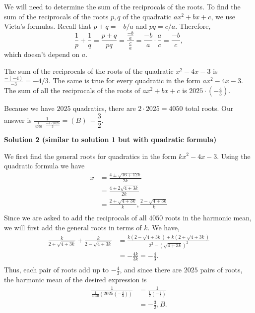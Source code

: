 \begin{enumerate}
We will need to determine the sum of the reciprocals of the roots. To find the sum of the reciprocals of the roots $p,q$ of the quadratic $ax^2+bx+c$, we use Vieta's formulas. Recall that $p+q = -b/a$ and $pq = c/a$. Therefore, 
 \[\frac{1}{p} + \frac{1}{q} = \frac{p+q}{pq} = \frac{\frac{-b}{a}}{\frac{c}{a}} = \frac{-b}{a} \cdot \frac{a}{c} = \frac{-b}{c},\]which doesn't depend on $a$.

 The sum of the reciprocals of the roots of the quadratic $x^2-4x-3$ is $\frac{-(-4)}{-3} = -4/3.$ The same is true for every quadratic in the form $ax^2-4x-3$. The sum of all the reciprocals of the roots of $ax^2+bx+c$ is $2025 \cdot \left(-\frac{4}{3}\right).$

 Because we have $2025$ quadratics, there are $2 \cdot 2025 = 4050$ total roots. Our answer is $\frac{1}{\frac{1}{4050}\cdot \frac{-4\cdot 2025}{3}} =\boxed{(B)\ -\dfrac{3}{2}}$.

 



\textbf{Solution 2 (similar to solution 1 but with quadratic formula)}

We first find the general roots for quadratics in the form $kx^2-4x-3$. Using the quadratic formula we have \begin{align*}x&=\frac{4 \pm \sqrt{16+12k}}{2k} \\&= \frac{4\pm 2\sqrt{4+3k}}{2k} \\&= \frac{2+\sqrt{4+3k}}{k}, \frac{2-\sqrt{4+3k}}{k} \\\end{align*}
Since we are asked to add the reciprocals of all $4050$ roots in the harmonic mean, we will first add the general roots in terms of $k$. We have,\begin{align*}\frac{k}{2+\sqrt{4+3k}} + \frac{k}{2-\sqrt{4+3k}} &= \frac{k(2-\sqrt{4+3k}) + k(2+\sqrt{4+3k})}{2^2-(\sqrt{4+3k})^2} \\&= -\frac{4k}{3k}=-\frac{4}{3}. \\\end{align*}
Thus, each pair of roots add up to $-\frac{4}{3}$, and since there are $2025$ pairs of roots, the harmonic mean of the desired expression is \begin{align*}\frac{1}{\frac{1}{4050} \left (2025 \left (-\frac43 \right ) \right)} &= \frac{1}{\frac12 \left ( -\frac43 \right)} \\& = \boxed{-\frac32}, \boxed{B}. \\\end{align*}



\end{enumerate}
